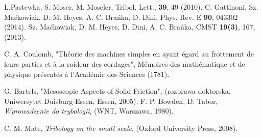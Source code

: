 \begin{thebibliography}{3}
\begin{spacing}{1.0}
 L.Pastewka, S. Moser, M. Moseler, Tribol. Lett., {\bf 39}, 49 (2010).
 C. Gattinoni,  Sz. Ma\'{c}kowiak, D. M. Heyes, A. C. Bra\'{n}ka, D. Dini, Phys. Rev. E {\bf 90}, 043302 (2014).
 Sz. Ma\'{c}kowiak, D. M. Heyes, D. Dini, A. C. Bra\'nka, CMST {\bf 19(3)}, 167, (2013).

 C. A. Coulomb, "Th\'{e}orie des machines simples en ayant \'{e}gard au frottement
de leurs parties et \`{a} la roideur des cordages", M\'{e}moires des math\'{e}matique et de physique pr\'{e}sent\'{e}s \`{a} l’Acad\'{e}mie des Sciences (1781).

 G. Bartels, "Mesoscopic Aspects of Solid Friction", (rozprawa doktorska, Uniwersytet Duisburg-Essen, Essen, 2005).
 F. P. Bowden, D. Tabor, {\it Wprowadzenie do trybologii}, (WNT, Warszawa, 1980).

 C. M. Mate, {\it Tribology on the small scale}, (Oxford University Press, 2008).


\end{spacing}
\end{thebibliography}
